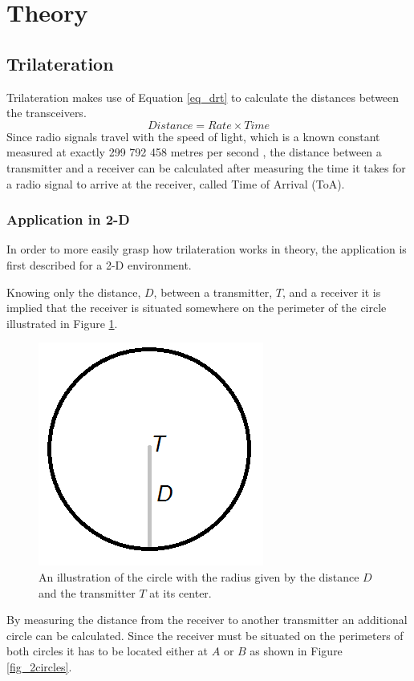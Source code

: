 \section{Theory}

\subsection{Trilateration}
Trilateration makes use of Equation \ref{eq_drt} to calculate the distances between the transceivers. 
\begin{equation} \label{eq_drt}
Distance = Rate \times Time
\end{equation}
Since radio signals travel with the speed of light, which is a known constant measured at exactly 299 792 458 metres per second 
\cite{young_university_2004,uzan_natural_2010}, the distance between a transmitter and a receiver can be calculated after measuring the time it takes for a radio signal to arrive at the receiver, called Time of Arrival (ToA). 

\subsubsection{Application in 2-D} \label{Trilateration2D}
In order to more easily grasp how trilateration works in theory, the application is first described for a 2-D environment.

Knowing only the distance, $D$, between a transmitter, $T$, and a receiver it is implied that the receiver is situated somewhere on the perimeter of the circle illustrated in Figure \ref{fig_circle}.
\begin{figure}[H] 
  \centering
      \includegraphics[height=0.25\textwidth]{img/Circle}
  \caption{An illustration of the circle with the radius given by the distance $D$ and the transmitter $T$ at its center.}
  \label{fig_circle}
\end{figure}

By measuring the distance from the receiver to another transmitter an additional circle can be calculated. Since the receiver must be situated on the perimeters of both circles it has to be located either at $A$ or $B$ as shown in Figure \ref{fig_2circles}.


